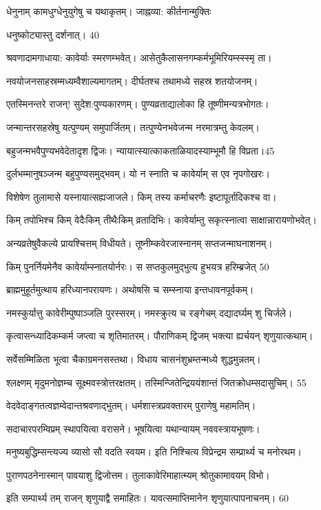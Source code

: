 धेनुनाम् कामधुग्धेनुयुगेषु च यथाकृतम्।
जाह्नव्या: कीर्तनान्मुक्तिः

धनुष्कोट्यास्तु दर्शनात्। 40

श्रवणादामगाधाया: कावेर्याः स्मरणम्भवेत्।
आसेतुकैलासनगम्कर्मभूमिरियम्स्स्स्मृ ता।

नवयोजनसाहस्रम्मध्यम्वैशाल्यमागतम्।
दीर्घतश्च तथामध्ये सहस्र शतयोजनम्।

एतस्मिनन्तरे राजन्! सुदेश:पुण्यकारणम्।
पुण्यव्रताद्यालोका हि तूष्णीमन्यत्रभोगतः।

जन्मान्तरसहस्रेषु यत्पुण्यम् समुपार्जितम्।
तत्पुण्येनभवेजन्म नरमात्रम्तु केवलम्।

बहुजन्मभवैपुण्यभवेदेतादृश द्विजः।
न्यायात्स्यात्काकताळियादस्याम्भूमौ हि विप्रता।45

दुर्लभम्मानुषञ्जन्म बहुपुण्यसमुद्भवम्।
यो न स्नाति च कावेर्याम् स एव नृपगोखरः।

विशेषेण तुलामासे यस्नायात्सह्यजाजले।
किम् तस्य कर्माचरणैः इष्टापूर्तादिकश्च वा।

किम् तपोभिश्च किम् वेदैःकिम् तीथैःकिम् व्रतादिभिः।
कावेर्याम्तु सकृत्स्नात्वा साक्षान्नारायणोभवेत्।

अन्यव्रतेषुवैकल्ये प्रायश्चित्तम् विधीयते।
तूष्नीम्कवेरजास्नानम् सप्तजन्माघनाशनम्।

किम् पुनर्नियमेनैव कावेर्याम्स्नातयोर्नरः।
स सप्तकुलमुद्भुत्य हुभयत्र हरिम्ब्रजेत् 50

ब्राह्ममुहूर्तमुत्थाय हरिध्यानपरायणः।
अथोषसि च सम्स्नाया इन्तधावनपूर्वकम्।

नमस्कुर्यात्तु कावेरीम्पुष्पाञ्जलि पुरस्सरम्।
नमस्क्रुत्य च रङ्गेचम् दद्यादर्घ्यम् शु चिर्जले।

कृत्वासन्ध्यादिकम्कर्म जप्त्वा च शृतिमातरम्।
पौराणिकम् द्विजम् भक्त्या ह्यर्चयन् शृणुयात्कथाम्।

सर्वेसम्मिळिता भूत्वा चैकाग्रमनसस्तथा।
विधाय चासनंशुभ्रम्तन्मध्ये शुद्धमुन्नतम्।

श्लक्ष्णम् मृदुमनोज्ञम्च सूक्ष्मवस्त्रोत्तरक्षतम्।
तस्मिन्जितेन्द्रिययंशान्तं जितक्रोधम्सदासुचिम्। 55

वेदवेदाङ्गतत्वज्ञम्वेदान्तश्रवणाद्भुतम्।
धर्मशास्त्रप्रवक्तारम् पुराणेषु महामतिम्।

सदाचारपरम्विप्रम् स्थापयित्वा वरासने।
भूषयित्वा यथान्यायम् नववस्त्रायभूषणः।

मनुष्यबुद्धिम्सन्त्यज्य व्यासो सौ वदति स्वयम।
इति निश्चित्य विप्रेन्द्रम सम्प्रार्थ्य च मनोरथम।

पुराणपठनेनास्मान् पावयाशु द्विजोत्तम।
तुलाकावेरिमाहात्म्यम् श्रोतुकामावयम् विभो।

इति सम्पार्थ्य तम् राजन् शृणुयाद्वै समाहितः।
यावत्समाप्तिमानेन शृणुयात्पापनाचनम्। 60

